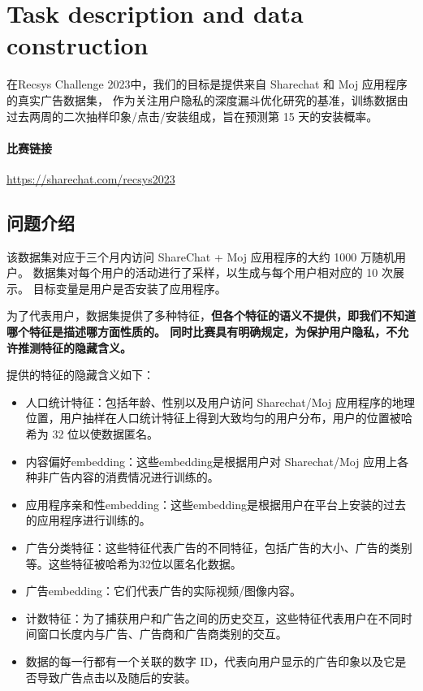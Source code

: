 \documentclass{article}
\begin{document}
\section{Task description and data construction}
\label{sec:headings}
在Recsys Challenge 2023中，我们的目标是提供来自 Sharechat 和 Moj 应用程序的真实广告数据集，
作为关注用户隐私的深度漏斗优化研究的基准，训练数据由过去两周的二次抽样印象/点击/安装组成，旨在预测第 15 天的安装概率。

\paragraph*{比赛链接}

\url{https://sharechat.com/recsys2023}

\subsection{问题介绍}

该数据集对应于三个月内访问 ShareChat + Moj 应用程序的大约 1000 万随机用户。 
数据集对每个用户的活动进行了采样，以生成与每个用户相对应的 10 次展示。 
目标变量是用户是否安装了应用程序。

为了代表用户，数据集提供了多种特征，\textbf{但各个特征的语义不提供，即我们不知道哪个特征是描述哪方面性质的。
同时比赛具有明确规定，为保护用户隐私，不允许推测特征的隐藏含义。}

提供的特征的隐藏含义如下：
\begin{itemize}
\item 人口统计特征：包括年龄、性别以及用户访问 Sharechat/Moj 应用程序的地理位置，用户抽样在人口统计特征上得到大致均匀的用户分布，用户的位置被哈希为 32 位以使数据匿名。
\item 内容偏好embedding：这些embedding是根据用户对 Sharechat/Moj 应用上各种非广告内容的消费情况进行训练的。
\item 应用程序亲和性embedding：这些embedding是根据用户在平台上安装的过去的应用程序进行训练的。
\item 广告分类特征：这些特征代表广告的不同特征，包括广告的大小、广告的类别等。这些特征被哈希为32位以匿名化数据。
\item 广告embedding：它们代表广告的实际视频/图像内容。
\item 计数特征：为了捕获用户和广告之间的历史交互，这些特征代表用户在不同时间窗口长度内与广告、广告商和广告商类别的交互。
\item 数据的每一行都有一个关联的数字 ID，代表向用户显示的广告印象以及它是否导致广告点击以及随后的安装。
\end{itemize}
\end{document}
